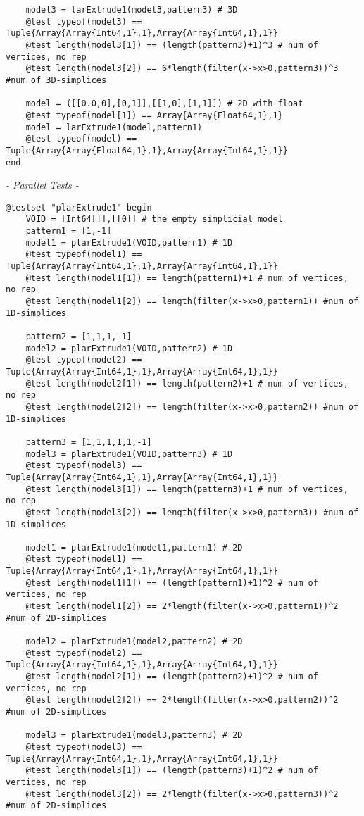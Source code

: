 \documentclass[a4paper,12pt,titlepage]{article}					%
\begin{document}
\begin{Verbatim}
	model3 = larExtrude1(model3,pattern3) # 3D
	@test typeof(model3) == Tuple{Array{Array{Int64,1},1},Array{Array{Int64,1},1}}
	@test length(model3[1]) == (length(pattern3)+1)^3 # num of vertices, no rep
	@test length(model3[2]) == 6*length(filter(x->x>0,pattern3))^3 #num of 3D-simplices
	
	model = ([[0.0,0],[0,1]],[[1,0],[1,1]]) # 2D with float
	@test typeof(model[1]) == Array{Array{Float64,1},1}
	model = larExtrude1(model,pattern1)
	@test typeof(model) == Tuple{Array{Array{Float64,1},1},Array{Array{Int64,1},1}}
end
\end{Verbatim}

\emph{- Parallel Tests -}

\begin{Verbatim}
@testset "plarExtrude1" begin
	VOID = [Int64[]],[[0]] # the empty simplicial model
	pattern1 = [1,-1]
	model1 = plarExtrude1(VOID,pattern1) # 1D
	@test typeof(model1) == Tuple{Array{Array{Int64,1},1},Array{Array{Int64,1},1}}
	@test length(model1[1]) == length(pattern1)+1 # num of vertices, no rep
	@test length(model1[2]) == length(filter(x->x>0,pattern1)) #num of 1D-simplices
	
	pattern2 = [1,1,1,-1]
	model2 = plarExtrude1(VOID,pattern2) # 1D
	@test typeof(model2) == Tuple{Array{Array{Int64,1},1},Array{Array{Int64,1},1}}
	@test length(model2[1]) == length(pattern2)+1 # num of vertices, no rep
	@test length(model2[2]) == length(filter(x->x>0,pattern2)) #num of 1D-simplices
	
	pattern3 = [1,1,1,1,1,-1]
	model3 = plarExtrude1(VOID,pattern3) # 1D
	@test typeof(model3) == Tuple{Array{Array{Int64,1},1},Array{Array{Int64,1},1}}
	@test length(model3[1]) == length(pattern3)+1 # num of vertices, no rep
	@test length(model3[2]) == length(filter(x->x>0,pattern3)) #num of 1D-simplices
	
	model1 = plarExtrude1(model1,pattern1) # 2D
	@test typeof(model1) == Tuple{Array{Array{Int64,1},1},Array{Array{Int64,1},1}}
	@test length(model1[1]) == (length(pattern1)+1)^2 # num of vertices, no rep
	@test length(model1[2]) == 2*length(filter(x->x>0,pattern1))^2 #num of 2D-simplices
	
	model2 = plarExtrude1(model2,pattern2) # 2D
	@test typeof(model2) == Tuple{Array{Array{Int64,1},1},Array{Array{Int64,1},1}}
	@test length(model2[1]) == (length(pattern2)+1)^2 # num of vertices, no rep
	@test length(model2[2]) == 2*length(filter(x->x>0,pattern2))^2 #num of 2D-simplices
	
	model3 = plarExtrude1(model3,pattern3) # 2D
	@test typeof(model3) == Tuple{Array{Array{Int64,1},1},Array{Array{Int64,1},1}}
	@test length(model3[1]) == (length(pattern3)+1)^2 # num of vertices, no rep
	@test length(model3[2]) == 2*length(filter(x->x>0,pattern3))^2 #num of 2D-simplices
	

\end{Verbatim}
\end{document}
